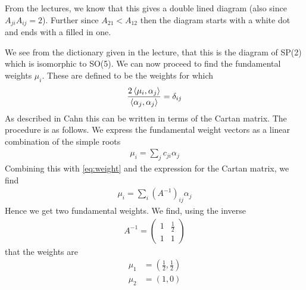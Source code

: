 \documentclass[a4paper,12pt]{article}
\begin{document}
From the lectures, we know that this gives a double lined diagram (also since $A_{ji}A_{ij}=2$). Further since $A_{21}<A_{12}$ then the diagram starts with a white dot and ends with a filled in one.
\begin{figure}[H]\centering
{}
\end{figure}
We see from the dictionary given in the lecture, that this is the diagram of SP(2) which is isomorphic to SO(5). We can now proceed to find the fundamental weights $\mu_i$. These are defined to be the weights for which
\begin{equation} \label{eq:weight}
	\begin{aligned}
		\frac{2\expval{\mu_i,\alpha_j}}{\expval{\alpha_j,\alpha_j}}=\delta_{ij}
	\end{aligned}
\end{equation}
As described in Cahn this can be written in terms of the Cartan matrix. The procedure is as follows. We express the fundamental weight vectors as a linear combination of the simple roots
\begin{equation}
	\begin{aligned}
		\mu_i= \sum_j c_{ji}\alpha_j
	\end{aligned}
\end{equation}
Combining this with \eqref{eq:weight} and the expression for the Cartan matrix, we find
\begin{equation}
	\begin{aligned}
		\mu_i= \sum_i (A^{-1})_{ij}\alpha_{j}
	\end{aligned}
\end{equation}
Hence we get two fundamental weights. We find, using the inverse
\begin{equation}
	\begin{aligned}
		A^{-1}=\begin{pmatrix}
		1 & \frac{1}{2}\\
		1 & 1
		\end{pmatrix}
	\end{aligned}
\end{equation}
that the weights are
\begin{equation}
	\begin{aligned}
		\mu_1&=\left(\frac{1}{2},\frac{1}{2}\right)\\
		\mu_2&=\left(1,0\right)
	\end{aligned}
\end{equation}
\end{document}

